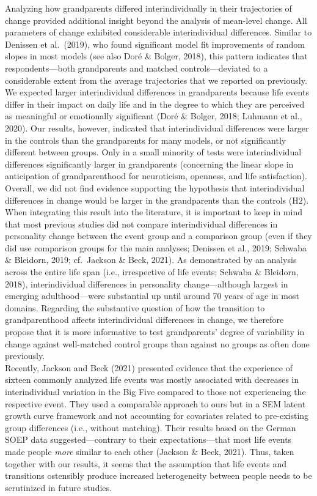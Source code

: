 \documentclass[
  english,
  man, noextraspace,floatsintext]{apa7}
\begin{document}
Analyzing how grandparents differed interindividually in their trajectories of change provided additional insight beyond the analysis of mean-level change. All parameters of change exhibited considerable interindividual differences. Similar to Denissen et al.~(2019), who found significant model fit improvements of random slopes in most models (see also Doré \& Bolger, 2018), this pattern indicates that respondents---both grandparents and matched controls---deviated to a considerable extent from the average trajectories that we reported on previously.\\
We expected larger interindividual differences in grandparents because life events differ in their impact on daily life and in the degree to which they are perceived as meaningful or emotionally significant (Doré \& Bolger, 2018; Luhmann et al., 2020). Our results, however, indicated that interindividual differences were larger in the controls than the grandparents for many models, or not significantly different between groups. Only in a small minority of tests were interindividual differences significantly larger in grandparents (concerning the linear slope in anticipation of grandparenthood for neuroticism, openness, and life satisfaction). Overall, we did not find evidence supporting the hypothesis that interindividual differences in change would be larger in the grandparents than the controls (H2).\\
When integrating this result into the literature, it is important to keep in mind that most previous studies did not compare interindividual differences in personality change between the event group and a comparison group (even if they did use comparison groups for the main analyses; Denissen et al., 2019; Schwaba \& Bleidorn, 2019; cf.~Jackson \& Beck, 2021). As demonstrated by an analysis across the entire life span (i.e., irrespective of life events; Schwaba \& Bleidorn, 2018), interindividual differences in personality change---although largest in emerging adulthood---were substantial up until around 70 years of age in most domains. Regarding the substantive question of how the transition to grandparenthood affects interindividual differences in change, we therefore propose that it is more informative to test grandparents' degree of variability in change against well-matched control groups than against no groups as often done previously.\\
Recently, Jackson and Beck (2021) presented evidence that the experience of sixteen commonly analyzed life events was mostly associated with decreases in interindividual variation in the Big Five compared to those not experiencing the respective event. They used a comparable approach to ours but in a SEM latent growth curve framework and not accounting for covariates related to pre-existing group differences (i.e., without matching). Their results based on the German SOEP data suggested---contrary to their expectations---that most life events made people \emph{more} similar to each other (Jackson \& Beck, 2021). Thus, taken together with our results, it seems that the assumption that life events and transitions ostensibly produce increased heterogeneity between people needs to be scrutinized in future studies.
\end{document}
